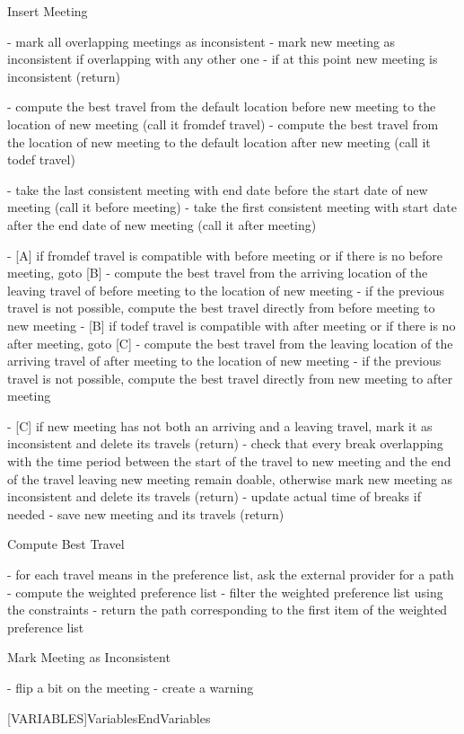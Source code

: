 Insert Meeting

- mark all overlapping meetings as inconsistent
- mark new meeting as inconsistent if overlapping with any other one
- if at this point new meeting is inconsistent (return)

- compute the best travel from the default location before new meeting to the location of new meeting (call it fromdef travel)
- compute the best travel from the location of new meeting to the default location after new meeting (call it todef travel)

- take the last consistent meeting with end date before the start date of new meeting (call it before meeting)
- take the first consistent meeting with start date after the end date of new meeting (call it after meeting)

- [A] if fromdef travel is compatible with before meeting or if there is no before meeting, goto [B]
- compute the best travel from the arriving location of the leaving travel of before meeting to the location of new meeting
- if the previous travel is not possible, compute the best travel directly from before meeting to new meeting
- [B] if todef travel is compatible with after meeting or if there is no after meeting, goto [C]
- compute the best travel from the leaving location of the arriving travel of after meeting to the location of new meeting
- if the previous travel is not possible, compute the best travel directly from new meeting to after meeting

- [C] if new meeting has not both an arriving and a leaving travel, mark it as inconsistent and delete its travels (return)
- check that every break overlapping with the time period between the start of the travel to new meeting and the end of the travel leaving new meeting remain doable, otherwise mark new meeting as inconsistent and delete its travels (return)
- update actual time of breaks if needed
- save new meeting and its travels (return)


Compute Best Travel

- for each travel means in the preference list, ask the external provider for a path
- compute the weighted preference list
- filter the weighted preference list using the constraints
- return the path corresponding to the first item of the weighted preference list

Mark Meeting as Inconsistent

- flip a bit on the meeting
- create a warning

\clearpage

[VARIABLES]{Variables}{EndVariables}
   {\algorithmicvariables}
   {\algorithmicend\ \algorithmicvariables}

